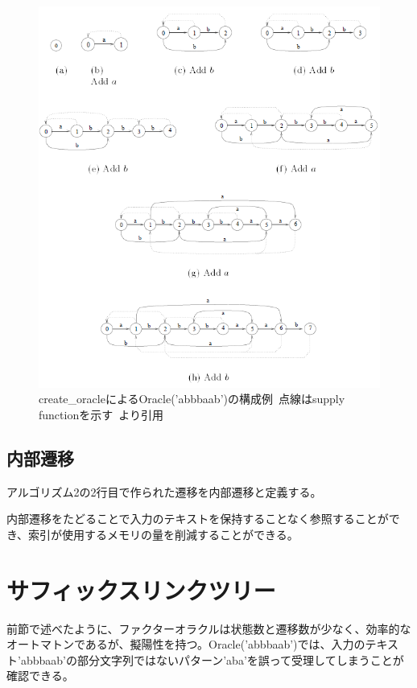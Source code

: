 \documentclass[11pt,a4paper]{jreport}
\begin{document}
  \begin{figure}[htbp]
    \centering
    \includegraphics[width=14cm]{createfo.png}
    \caption{create\_oracleによるOracle('abbbaab')の構成例\ 点線はsupply functionを示す\ \cite{allauzen}より引用}
  \end{figure}

  \subsection{内部遷移}
  アルゴリズム2の2行目で作られた遷移を内部遷移と定義する。

  内部遷移をたどることで入力のテキストを保持することなく参照することができ、索引が使用するメモリの量を削減することができる。

  \newpage
  \section{サフィックスリンクツリー}
  前節で述べたように、ファクターオラクルは状態数と遷移数が少なく、効率的なオートマトンであるが、擬陽性を持つ。Oracle('abbbaab')では、入力のテキスト'abbbaab'の部分文字列ではないパターン'aba'を誤って受理してしまうことが確認できる。
\end{document}
